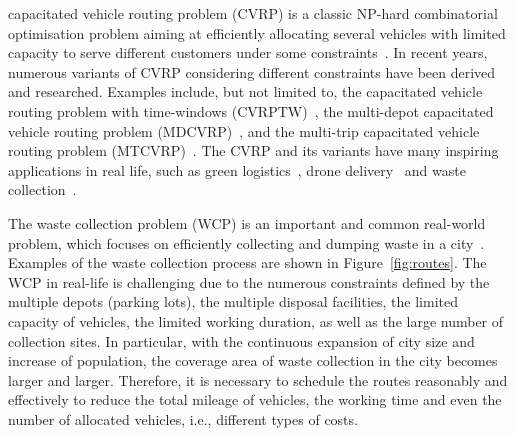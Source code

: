 \documentclass[journal]{IEEEtran}
\begin{document}
 capacitated vehicle routing problem (CVRP) is a classic NP-hard combinatorial optimisation problem aiming at efficiently allocating several vehicles with limited capacity to serve different customers under some constraints~\cite{dantzig1959truck,lenstra1981complexity,eksioglu2009vehicle}. In recent years, numerous variants of CVRP considering different constraints have been derived and researched. Examples include, but not limited to, the capacitated vehicle routing problem with time-windows (CVRPTW)~\cite{baldacci2012recent}, the multi-depot capacitated vehicle routing problem (MDCVRP)~\cite{liu2010two}, and the multi-trip capacitated vehicle routing problem (MTCVRP)~\cite{mingozzi2013exact}. The CVRP and its variants have many inspiring applications in real life, such as green logistics~\cite{ubeda2011green}, drone delivery~\cite{dorling2016vehicle} and waste collection~\cite{kim2006waste}.

The waste collection problem (WCP) is an important and common real-world problem, which focuses on efficiently collecting and dumping waste in a city~\cite{beltrami1974networks}. Examples of the waste collection process are shown in Figure~\ref{fig:routes}. The WCP in real-life is challenging due to the numerous constraints defined by the multiple depots (parking lots), the multiple disposal facilities, the limited capacity of vehicles, the limited working duration, as well as the large number of collection sites. 
In particular, with the continuous expansion of city size and increase of population, the coverage area of waste collection in the city becomes larger and larger. Therefore, it is necessary to schedule the routes reasonably and effectively to reduce the total mileage of vehicles, the working time and even the number of allocated vehicles, i.e., different types of costs. 
\end{document}
